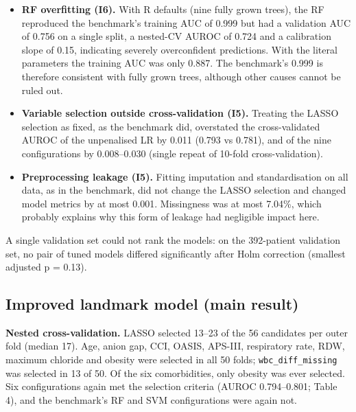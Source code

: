 \begin{itemize}
\tightlist
\item
  \textbf{RF overfitting (I6).} With R defaults (nine fully grown trees), the RF
  reproduced the benchmark's training AUC of 0.999 but had a validation AUC of
  0.756 on a single split, a nested-CV AUROC of 0.724 and a calibration slope of
  0.15, indicating severely overconfident predictions. With the literal
  parameters the training AUC was only 0.887. The benchmark's 0.999 is therefore
  consistent with fully grown trees, although other causes cannot be ruled out.
\item
  \textbf{Variable selection outside cross-validation (I5).} Treating the LASSO
  selection as fixed, as the benchmark did, overstated the cross-validated AUROC
  of the unpenalised LR by 0.011 (0.793 vs 0.781), and of the nine
  configurations by 0.008--0.030 (single repeat of 10-fold cross-validation).
\item
  \textbf{Preprocessing leakage (I5).} Fitting imputation and standardisation on
  all data, as in the benchmark, did not change the LASSO selection and changed
  model metrics by at most 0.001. Missingness was at most 7.04\%, which probably
  explains why this form of leakage had negligible impact here.
\end{itemize}

A single validation set could not rank the models: on the 392-patient validation
set, no pair of tuned models differed significantly after Holm correction
(smallest adjusted p = 0.13).

\hypertarget{improved-landmark-model-main-result}{%
\subsection{Improved landmark model (main
result)}\label{improved-landmark-model-main-result}}

\textbf{Nested cross-validation.} LASSO selected 13--23 of the 56 candidates per
outer fold (median 17). Age, anion gap, CCI, OASIS, APS-III, respiratory rate,
RDW, maximum chloride and obesity were selected in all 50 folds;
\texttt{wbc\_diff\_missing} was selected in 13 of 50. Of the six comorbidities,
only obesity was ever selected. Six configurations again met the selection
criteria (AUROC 0.794--0.801; Table 4), and the benchmark's RF and SVM
configurations were again not.

